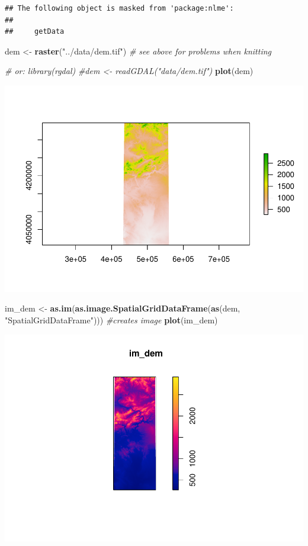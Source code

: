 \documentclass[]{article}
\newenvironment{Shaded}{\begin{snugshade}}{\end{snugshade}}
\newcommand{\KeywordTok}[1]{\textcolor[rgb]{0.13,0.29,0.53}{\textbf{{#1}}}}
\newcommand{\StringTok}[1]{\textcolor[rgb]{0.31,0.60,0.02}{{#1}}}
\newcommand{\CommentTok}[1]{\textcolor[rgb]{0.56,0.35,0.01}{\textit{{#1}}}}
\newcommand{\NormalTok}[1]{{#1}}
\begin{document}
\begin{verbatim}
## The following object is masked from 'package:nlme':
## 
##     getData
\end{verbatim}

\begin{Shaded}
\begin{Highlighting}[]
\NormalTok{dem <-}\StringTok{ }\KeywordTok{raster}\NormalTok{(}\StringTok{"../data/dem.tif"}\NormalTok{) }\CommentTok{# see above for problems when knitting}

\CommentTok{# or: library(rgdal)}
\CommentTok{#dem <- readGDAL("data/dem.tif")}
\KeywordTok{plot}\NormalTok{(dem)}
\end{Highlighting}
\end{Shaded}

\includegraphics{HarranPlain_files/figure-latex/unnamed-chunk-6-1.pdf}

\begin{Shaded}
\begin{Highlighting}[]
\NormalTok{im_dem <-}\StringTok{ }\KeywordTok{as.im}\NormalTok{(}\KeywordTok{as.image.SpatialGridDataFrame}\NormalTok{(}\KeywordTok{as}\NormalTok{(dem, }\StringTok{"SpatialGridDataFrame"}\NormalTok{))) }\CommentTok{#creates image}
\KeywordTok{plot}\NormalTok{(im_dem)}
\end{Highlighting}
\end{Shaded}

\includegraphics{HarranPlain_files/figure-latex/unnamed-chunk-6-2.pdf}
\end{document}
